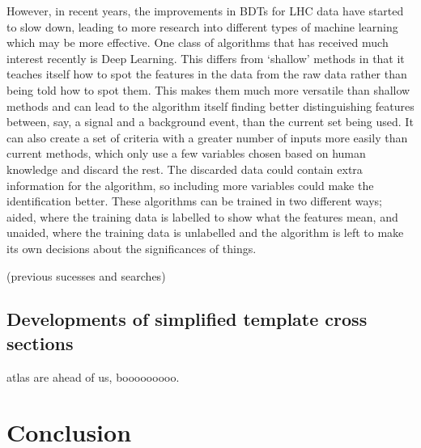 \documentclass[12pt]{article}
\begin{document}
However, in recent years, the improvements in BDTs for LHC data have started to slow down, leading to more research into different types of machine learning which may be more effective. One class of algorithms that has received much interest recently is Deep Learning. This differs from `shallow' methods in that it teaches itself how to spot the features in the data from the raw data rather than being told how to spot them. This makes them much more versatile than shallow methods and can lead to the algorithm itself finding better distinguishing features between, say, a signal and a background event, than the current set being used. It can also create a set of criteria with a greater number of inputs more easily than current methods, which only use a few variables chosen based on human knowledge and discard the rest. The discarded data could contain extra information for the algorithm, so including more variables could make the identification better. These algorithms can be trained in two different ways; aided, where the training data is labelled to show what the features mean, and unaided, where the training data is unlabelled and the algorithm is left to make its own decisions about the significances of things. 

(previous sucesses and searches)

 


\subsection*{Developments of simplified template cross sections}
atlas are ahead of us, booooooooo. 

\section*{Conclusion}



{}

\end{document}
